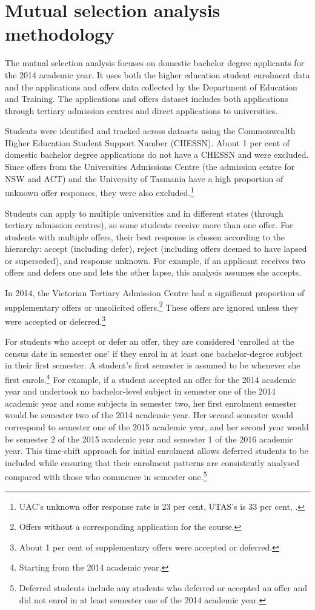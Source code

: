 \chapter{Mutual selection analysis methodology}\label{chap:a}

The mutual selection analysis focuses on domestic bachelor degree applicants for the 2014 academic year. It uses both the higher education student enrolment data and the applications and offers data collected by the Department of Education and Training. The applications and offers dataset includes both applications through tertiary admission centres and direct applications to universities.

Students were identified and tracked across datasets using the Commonwealth Higher Education Student Support Number (CHESSN). About 1 per cent of domestic bachelor degree applications do not have a CHESSN and were excluded. Since offers from the Universities Admissions Centre (the admission centre for NSW and ACT) and the University of Tasmania have a high proportion of unknown offer responses, they were also excluded.\footnote{UAC's unknown offer response rate is 23 per cent, UTAS's is 33 per cent, \textcite{DepartmentofEducationandTraininga}.}

Students can apply to multiple universities and in different states (through tertiary admission centres), so some students receive more than one offer. For students with multiple offers, their best response is chosen according to the hierarchy: accept (including defer), reject (including offers deemed to have lapsed or superseded), and response unknown. For example, if an applicant receives two offers and defers one and lets the other lapse, this analysis assumes she accepts.

In 2014, the Victorian Tertiary Admission Centre had a significant proportion of supplementary offers or unsolicited offers.\footnote{Offers without a corresponding application for the course.} 
These offers are ignored unless they were accepted or deferred.\footnote{About 1 per cent of supplementary offers were accepted or deferred.}

For students who accept or defer an offer, they are considered `enrolled at the census date in semester one' if they enrol in at least one bachelor-degree subject in their first semester. A student's first semester is assumed to be whenever she first enrols.\footnote{Starting from the 2014 academic year.} 
For example, if a student accepted an offer for the 2014 academic year and undertook no bachelor-level subject in semester one of the 2014 academic year and some subjects in semester two, her first enrolment semester would be semester two of the 2014 academic year. Her second semester would correspond to semester one of the 2015 academic year, and her second year would be semester 2 of the 2015 academic year and semester 1 of the 2016 academic year. This time-shift approach for initial enrolment allows deferred students to be included while ensuring that their enrolment patterns are consistently analysed compared with those who commence in semester one.\footnote{Deferred students include any students who deferred or accepted an offer and did not enrol in at least semester one of the 2014 academic year.}

